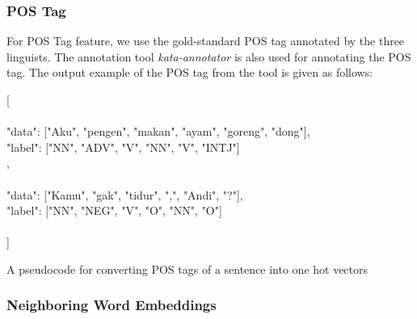 \subsubsection{POS Tag}
For POS Tag feature, we use the gold-standard POS tag annotated by the three linguists. The annotation tool \textit{kata-annotator} is also used for annotating the POS tag. The output example of the POS tag from the tool is given as follows:

[\\
{\\
	"data": ["Aku", "pengen", "makan", "ayam", "goreng", "dong"],\\
	"label": ["NN", "ADV", "V", "NN", "V", "INTJ"]\\
},\\
{\\
	"data": ["Kamu", "gak", "tidur", ",", "Andi", "?"],\\
	"label": ["NN", "NEG", "V", "O", "NN", "O"]\\
}\\
]


\begin{kode}
	
	
	\caption{A pseudocode for converting POS tags of a sentence into one hot vectors}
	\label{code:ekstraksipostag}
	
\end{kode}


\subsubsection{Neighboring Word Embeddings}

